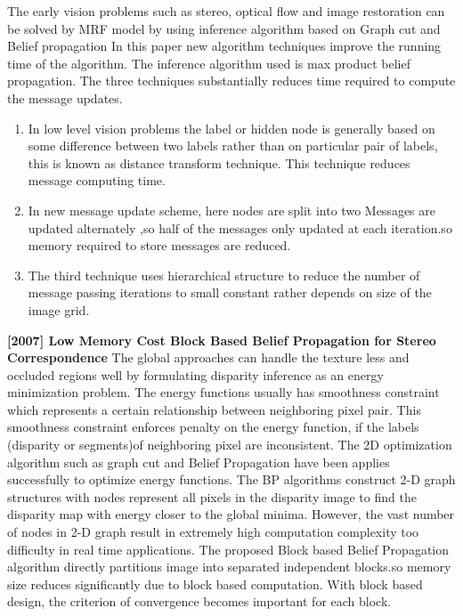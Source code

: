 The early vision problems such as stereo, optical flow and image restoration can be solved by MRF model by using inference algorithm based on Graph cut and Belief propagation In this paper new algorithm techniques improve the running time of the algorithm.
The inference algorithm used is max product belief propagation.\newline
The three techniques  substantially reduces time required to compute the message updates.
\begin{enumerate}
  \item In low level vision problems the label or hidden node is generally based on some difference between two labels rather than on particular pair of labels, this is known as distance transform technique. This technique reduces message computing time.
  \item In new message update scheme, here nodes are split into two
Messages are updated alternately ,so half of the messages only updated at each iteration.so memory required to store messages are reduced.
\item The third technique uses hierarchical structure to reduce the number of message passing iterations to small constant rather depends on size of the image grid.
\end{enumerate}
\textbf{[2007]   Low Memory Cost Block Based Belief Propagation for Stereo Correspondence}\cite{r3}\newline
The global approaches can handle the texture less and occluded regions well by formulating disparity inference as an energy minimization problem. The energy functions usually has smoothness constraint which represents a certain relationship between neighboring  pixel pair. This smoothness constraint enforces penalty on the energy function, if the labels (disparity or segments)of neighboring pixel are inconsistent.\newline
 The 2D optimization algorithm such as graph cut and Belief Propagation have been applies successfully to optimize energy functions. The BP algorithms construct 2-D graph structures with nodes represent all pixels in the disparity image to find the disparity map with energy closer to the global minima. However, the vast number of nodes in 2-D graph result in extremely high computation complexity too difficulty in real time applications.\newline
The proposed Block based Belief Propagation algorithm directly partitions image into separated independent blocks.so memory size reduces significantly due to block based computation. With block based design, the criterion of convergence becomes important for each block. \newline
